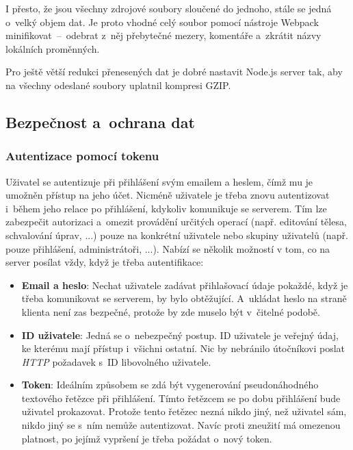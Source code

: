 \documentclass[a4paper,12pt]{article}
\begin{document}
I přesto, že jsou všechny zdrojové soubory sloučené do jednoho, stále se jedná o~velký objem dat. Je proto vhodné celý soubor pomocí nástroje Webpack minifikovat~–~odebrat z~něj přebytečné mezery, komentáře a~zkrátit názvy lokálních proměnných.

Pro ještě větší redukci přenesených dat je dobré nastavit Node.js server tak, aby na všechny odeslané soubory uplatnil kompresi GZIP.

\subsection{Bezpečnost a~ochrana dat}

\subsubsection{Autentizace pomocí tokenu}

Uživatel se autentizuje při přihlášení svým emailem a heslem, čímž mu je umožněn přístup na jeho účet. Nicméně uživatele je třeba znovu autentizovat i~během jeho relace po přihlášení, kdykoliv komunikuje se serverem. Tím lze zabezpečit autorizaci a~omezit provádění určitých operací (např. editování tělesa, schvalování úprav, ...) pouze na konkrétní uživatele nebo skupiny uživatelů (např. pouze přihlášení, administrátoři, ...). Nabízí se několik možností v tom, co na server posílat vždy, když je třeba autentifikace:

\begin{itemize}
\item \textbf{Email a heslo}: Nechat uživatele zadávat přihlašovací údaje pokaždé, když je třeba komunikovat se serverem, by bylo obtěžující. A~ukládat heslo na straně klienta není zas bezpečné, protože by zde muselo být v~čitelné podobě.

\item \textbf{ID uživatele}: Jedná se o~nebezpečný postup. ID uživatele je veřejný údaj, ke kterému mají přístup i~všichni ostatní. Nic by nebránilo útočníkovi poslat \textit{HTTP} požadavek s~ID libovolného uživatele.

\item \textbf{Token}: Ideálním způsobem se zdá být vygenerování pseudonáhodného textového řetězce při přihlášení. Tímto řetězcem se po dobu přihlášení bude uživatel prokazovat. Protože tento řetězec nezná nikdo jiný, než uživatel sám, nikdo jiný se s~ním nemůže autentizovat. Navíc proti zneužití má omezenou platnost, po jejímž vypršení je třeba požádat o~nový token.
\end{itemize}
\end{document}
